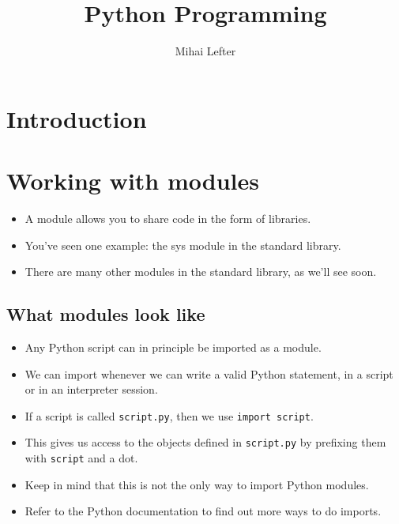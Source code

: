 \documentclass[aspectratio=1610,slidestop]{beamer}
\author{Mihai Lefter}
\title{Python Programming}
\begin{document}


\section{Introduction}
\makeTableOfContents

\section{Working with modules}

\begin{pframe}
 \begin{itemize}
  \item A module allows you to share code in the form of libraries.
  \item You've seen one example: the sys module in the standard library.
  \item There are many other modules in the standard library, as we'll see soon.
 \end{itemize}
\end{pframe}

\subsection{What modules look like}
\begin{pframe}
 \begin{itemize}
  \item Any Python script can in principle be imported as a module.
  \item We can import whenever we can write a valid Python statement, in a
  script or in an interpreter session.
  \item If a script is called \texttt{script.py}, then we use
  \texttt{import script}.
  \item This gives us access to the objects defined in \texttt{script.py} by
  prefixing them with \texttt{script} and a dot.
  \item Keep in mind that this is not the only way to import Python modules.
  \item Refer to the Python documentation to find out more ways to do imports.
 \end{itemize}
\end{pframe}
\end{document}
